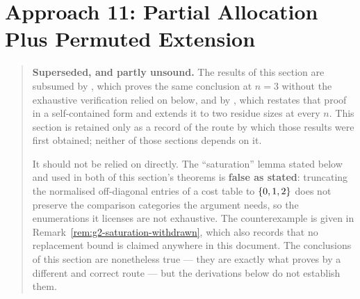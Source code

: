 \section{Approach 11: Partial Allocation Plus Permuted Extension}
\label{sec:approach11-superseded-note}

\begin{quote}
\textbf{Superseded, and partly unsound.} The results of this section are
subsumed by , which proves the same conclusion at
$n = 3$ without the exhaustive verification relied on below, and by
, which restates that proof in a self-contained form
and extends it to two residue sizes at every $n$. This section is retained
only as a record of the route by which those results were first obtained;
neither of those sections depends on it.

It should not be relied on directly. The ``saturation'' lemma stated below
and used in both of this section's theorems is \textbf{false as stated}:
truncating the normalised off-diagonal entries of a cost table to
$\left\{0,1,2\right\}$ does not preserve the comparison categories the argument
needs, so the enumerations it licenses are not exhaustive. The counterexample
is given in Remark~\ref{rem:g2-saturation-withdrawn}, which also records that
no replacement bound is claimed anywhere in this document. The conclusions of
this section are
nonetheless true --- they are exactly what  proves by a
different and correct route --- but the derivations below do not establish
them.
\end{quote}
\label{sec:approach11}

